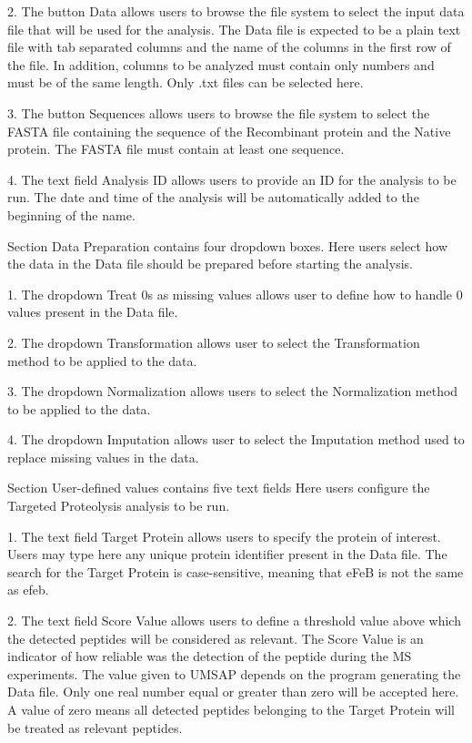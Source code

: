 \num{2}. The button Data allows users to browse the file system to select the input
data file that will be used for the analysis. The Data file is expected to be a
plain text file with tab separated columns and the name of the columns in the first
row of the file. In addition, columns to be analyzed must contain only numbers and
must be of the same length. Only .txt files can be selected here.

\num{3}. The button Sequences allows users to browse the file system to select the
FASTA file containing the sequence of the Recombinant protein and the Native protein.
The FASTA file must contain at least one sequence.

\num{4}. The text field Analysis ID allows users to provide an ID for the analysis
to be run. The date and time of the analysis will be automatically added to the
beginning of the name.

Section Data Preparation contains four dropdown boxes. Here users select how the data
in the Data file should be prepared before starting the analysis.

\num{1}. The dropdown Treat \num{0}s as missing values allows user to define how
to handle \num{0} values present in the Data file.

\num{2}. The dropdown Transformation allows user to select the Transformation method
to be applied to the data.

\num{3}. The dropdown Normalization allows users to select the Normalization method
to be applied to the data.

\num{4}. The dropdown Imputation allows user to select the Imputation method used
to replace missing values in the data.

Section User-defined values contains five text fields Here users configure the 
Targeted Proteolysis analysis to be run.

\num{1}. The text field Target Protein\label{par:limprotTargetProtein} allows users
to specify the protein of interest. Users may type here any unique protein identifier
present in the Data file. The search for the Target Protein is case-sensitive, meaning
that eFeB is not the same as efeb.

\num{2}. The text field Score Value\label{par:limprotScoreValue} allows users to
define a threshold value above which the detected peptides will be considered as
relevant. The Score Value is an indicator of how reliable was the detection of the peptide
during the MS experiments. The value given to UMSAP depends on the program generating
the Data file. Only one real number equal or greater than zero will be accepted here.
A value of zero means all detected peptides belonging to the Target Protein will
be treated as relevant peptides.

